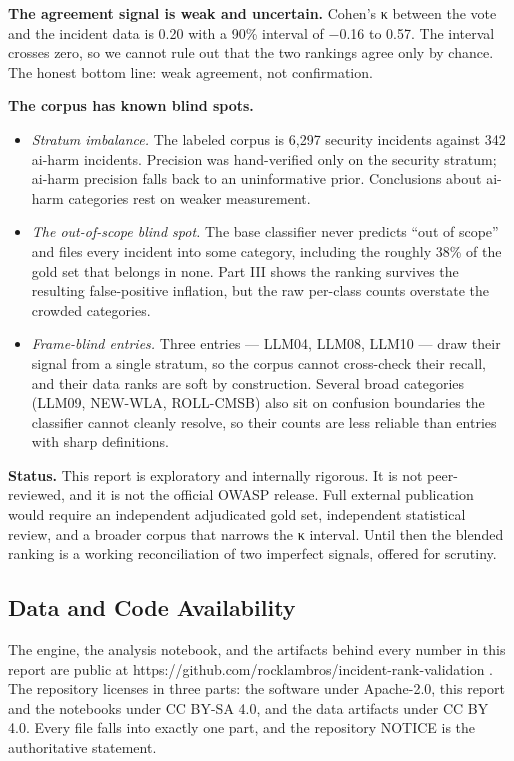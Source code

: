 \documentclass[11pt]{article}
\providecommand{\tightlist}{%
  \setlength{\itemsep}{0pt}\setlength{\parskip}{0pt}}
\begin{document}
\textbf{The agreement signal is weak and uncertain.} Cohen's κ between
the vote and the incident data is 0.20 with a 90\% interval of −0.16 to
0.57. The interval crosses zero, so we cannot rule out that the two
rankings agree only by chance. The honest bottom line: weak agreement,
not confirmation.

\textbf{The corpus has known blind spots.}

\begin{itemize}
\tightlist
\item
  \emph{Stratum imbalance.} The labeled corpus is 6,297 security
  incidents against 342 ai-harm incidents. Precision was hand-verified
  only on the security stratum; ai-harm precision falls back to an
  uninformative prior. Conclusions about ai-harm categories rest on
  weaker measurement.
\item
  \emph{The out-of-scope blind spot.} The base classifier never predicts
  ``out of scope'' and files every incident into some category,
  including the roughly 38\% of the gold set that belongs in none. Part
  III shows the ranking survives the resulting false-positive inflation,
  but the raw per-class counts overstate the crowded categories.
\item
  \emph{Frame-blind entries.} Three entries --- LLM04, LLM08, LLM10 ---
  draw their signal from a single stratum, so the corpus cannot
  cross-check their recall, and their data ranks are soft by
  construction. Several broad categories (LLM09, NEW-WLA, ROLL-CMSB)
  also sit on confusion boundaries the classifier cannot cleanly
  resolve, so their counts are less reliable than entries with sharp
  definitions.
\end{itemize}

\textbf{Status.} This report is exploratory and internally rigorous. It
is not peer-reviewed, and it is not the official OWASP release. Full
external publication would require an independent adjudicated gold set,
independent statistical review, and a broader corpus that narrows the κ
interval. Until then the blended ranking is a working reconciliation of
two imperfect signals, offered for scrutiny.

\subsection{Data and Code
Availability}\label{data-and-code-availability}

The engine, the analysis notebook, and the artifacts behind every number
in this report are public at
https://github.com/rocklambros/incident-rank-validation . The repository
licenses in three parts: the software under Apache-2.0, this report and
the notebooks under CC BY-SA 4.0, and the data artifacts under CC BY
4.0. Every file falls into exactly one part, and the repository NOTICE
is the authoritative statement.
\end{document}
